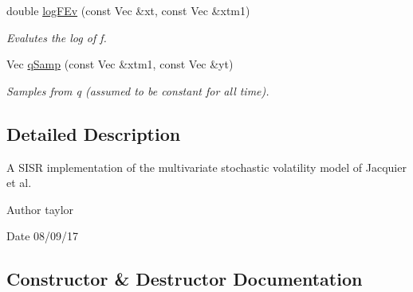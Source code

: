 \begin{DoxyCompactItemize}
double \hyperlink{classJacEtAl_a7742c736cf4136968dcf8629c4a3914e}{log\+F\+Ev} (const Vec \&xt, const Vec \&xtm1)
\begin{DoxyCompactList}\small\item\em Evalutes the log of f. \end{DoxyCompactList}\item 
Vec \hyperlink{classJacEtAl_a2b2696527c89fdf462639e55dfbc67ce}{q\+Samp} (const Vec \&xtm1, const Vec \&yt)
\begin{DoxyCompactList}\small\item\em Samples from q (assumed to be constant for all time). \end{DoxyCompactList}\end{DoxyCompactItemize}


\subsection{Detailed Description}
A S\+I\+SR implementation of the multivariate stochastic volatility model of Jacquier et al. 

\begin{DoxyAuthor}{Author}
taylor 
\end{DoxyAuthor}
\begin{DoxyDate}{Date}
08/09/17 
\end{DoxyDate}


\subsection{Constructor \& Destructor Documentation}
